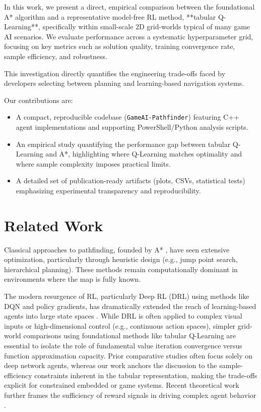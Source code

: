 \documentclass[conference]{IEEEtran}
\begin{document}
	In this work, we present a direct, empirical comparison between the foundational A* algorithm and a representative model-free RL method, **tabular Q-Learning**, specifically within small-scale 2D grid-worlds typical of many game AI scenarios. We evaluate performance across a systematic hyperparameter grid, focusing on key metrics such as solution quality, training convergence rate, sample efficiency, and robustness.
	
	This investigation directly quantifies the engineering trade-offs faced by developers selecting between planning and learning-based navigation systems.
	
	Our contributions are:
	\begin{itemize}
		\item A compact, reproducible codebase (\texttt{GameAI-Pathfinder}) featuring C++ agent implementations and supporting PowerShell/Python analysis scripts.
		\item An empirical study quantifying the performance gap between tabular Q-Learning and A*, highlighting where Q-Learning matches optimality and where sample complexity imposes practical limits.
		\item A detailed set of publication-ready artifacts (plots, CSVs, statistical tests) emphasizing experimental transparency and reproducibility.
	\end{itemize}
	
	\section{Related Work}
	Classical approaches to pathfinding, founded by A* \cite{hart1968formal}, have seen extensive optimization, particularly through heuristic design (e.g., jump point search, hierarchical planning). These methods remain computationally dominant in environments where the map is fully known.
	
	The modern resurgence of RL, particularly Deep RL (DRL) using methods like DQN \cite{mnih2015human} and policy gradients, has dramatically extended the reach of learning-based agents into large state spaces \cite{sutton2018reinforcement}. While DRL is often applied to complex visual inputs or high-dimensional control (e.g., continuous action spaces), simpler grid-world comparisons using foundational methods like tabular Q-Learning are essential to isolate the role of fundamental value iteration convergence versus function approximation capacity. Prior comparative studies often focus solely on deep network agents, whereas our work anchors the discussion to the sample-efficiency constraints inherent in the tabular representation, making the trade-offs explicit for constrained embedded or game systems. Recent theoretical work further frames the sufficiency of reward signals in driving complex agent behavior \cite{silver2021reward}.
	
\end{document}

